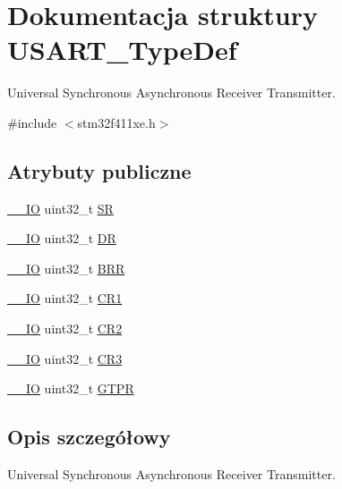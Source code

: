 \hypertarget{struct_u_s_a_r_t___type_def}{}\section{Dokumentacja struktury U\+S\+A\+R\+T\+\_\+\+Type\+Def}
\label{struct_u_s_a_r_t___type_def}


Universal Synchronous Asynchronous Receiver Transmitter.  




{\ttfamily \#include $<$stm32f411xe.\+h$>$}

\subsection*{Atrybuty publiczne}
\begin{DoxyCompactItemize}
\item 
\hyperlink{core__sc300_8h_aec43007d9998a0a0e01faede4133d6be}{\+\_\+\+\_\+\+IO} uint32\+\_\+t \hyperlink{struct_u_s_a_r_t___type_def_a706005f59139b9ff8ee5755677e12bc7}{SR}
\item 
\hyperlink{core__sc300_8h_aec43007d9998a0a0e01faede4133d6be}{\+\_\+\+\_\+\+IO} uint32\+\_\+t \hyperlink{struct_u_s_a_r_t___type_def_a1db25b74d47af33dc4f4fe2177fc5da0}{DR}
\item 
\hyperlink{core__sc300_8h_aec43007d9998a0a0e01faede4133d6be}{\+\_\+\+\_\+\+IO} uint32\+\_\+t \hyperlink{struct_u_s_a_r_t___type_def_a6ef06ba9d8dc2dc2a0855766369fa7c9}{B\+RR}
\item 
\hyperlink{core__sc300_8h_aec43007d9998a0a0e01faede4133d6be}{\+\_\+\+\_\+\+IO} uint32\+\_\+t \hyperlink{struct_u_s_a_r_t___type_def_a6d7dcd3972a162627bc3470cbf992ec4}{C\+R1}
\item 
\hyperlink{core__sc300_8h_aec43007d9998a0a0e01faede4133d6be}{\+\_\+\+\_\+\+IO} uint32\+\_\+t \hyperlink{struct_u_s_a_r_t___type_def_aa7ede2de6204c3fc4bd9fb328801c99a}{C\+R2}
\item 
\hyperlink{core__sc300_8h_aec43007d9998a0a0e01faede4133d6be}{\+\_\+\+\_\+\+IO} uint32\+\_\+t \hyperlink{struct_u_s_a_r_t___type_def_af2991da9a4e1539530cd6b7b327199cc}{C\+R3}
\item 
\hyperlink{core__sc300_8h_aec43007d9998a0a0e01faede4133d6be}{\+\_\+\+\_\+\+IO} uint32\+\_\+t \hyperlink{struct_u_s_a_r_t___type_def_ae23acff49b4ff96fd29093e80fc7d72e}{G\+T\+PR}
\end{DoxyCompactItemize}


\subsection{Opis szczegółowy}
Universal Synchronous Asynchronous Receiver Transmitter. 

